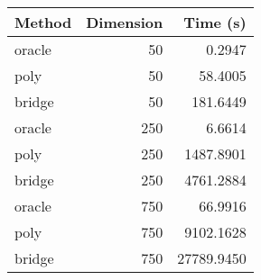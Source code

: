 
\begin{tabular}{lrr}
    \toprule
    Method & Dimension & Time (s)   \\
    \midrule
    oracle & 50        & 0.2947     \\
    poly   & 50        & 58.4005    \\
    bridge & 50        & 181.6449   \\
    \addlinespace
    oracle & 250       & 6.6614     \\
    poly   & 250       & 1487.8901  \\
    bridge & 250       & 4761.2884  \\
    \addlinespace
    oracle & 750       & 66.9916    \\
    poly   & 750       & 9102.1628  \\
    bridge & 750       & 27789.9450 \\
    \bottomrule
\end{tabular}
